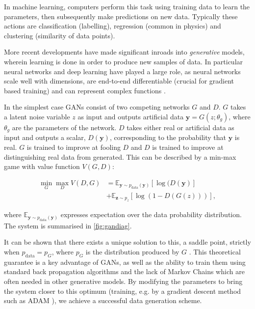 \documentclass[twocolumn]{article}
\begin{document}
In machine learning, computers perform this task using training data to learn the parameters, then subsequently make predictions on new data. Typically these actions are classification (labelling), regression (common in physics) and clustering (similarity of data points). 

More recent developments have made significant inroads into \textit{generative} models, wherein learning is done in order to produce new samples of data. In particular neural networks and deep learning have played a large role, as neural networks scale well with dimensions, are end-to-end differentiable (crucial for gradient based training) and can represent complex functions \cite{deepgen}.


In the simplest case GANs consist of two competing networks $G$ and $D$. $G$ takes a latent noise variable $z$ as input and outputs artificial data $\mathbf{y} = G(z;\theta_g)$, where $\theta_g$ are the parameters of the network. $D$ takes either real or artificial data as input and outputs a scalar, $D(\mathbf{y})$, corresponding to the probability that $\mathbf{y}$ is real. $G$ is trained to improve at fooling $D$ and $D$ is trained to improve at distinguishing real data from generated. This can be described by a min-max game with value function $V(G,D)$:

\begin{equation}
	\label{eq:minmax}
	\begin{split}
	\min_{G}\max_{D}V(D,G) &= \mathbb{E}_{\mathbf{y}\sim p_{\text{data}}(\mathbf{y})} [\log(D(\mathbf{y})]\\
	&  +\mathbb{E}_{\mathbf{z}\sim p_{z}} [\log(1-D(G(z)))],
	\end{split}
\end{equation} 

where  $\mathbb{E}_{\mathbf{y}\sim p_{\text{data}}(\mathbf{y})}$ expresses expectation over the data probability distribution. The system is summarised in \cref{fig:gandiag}.

It can be shown that there exists a unique solution to this, a saddle point, strictly when $p_{\text{data}} = p_G$, where $p_G$ is the distribution produced by $G$ \cite{gan1}. This theoretical guarantee is a key advantage of GANs, as well as the ability to train them using standard back propagation algorithms and the lack of Markov Chains which are often needed in other generative models. By modifying the parameters to bring the system closer to this optimum (training, e.g. by a gradient descent method such as ADAM \cite{adam}), we achieve a successful data generation scheme.   
\end{document}

